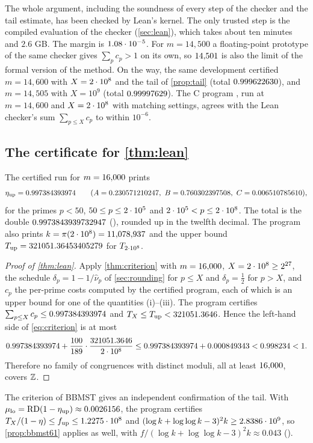 The whole argument, including the soundness of every step of the checker and the tail estimate, has been checked by
Lean's kernel. The only trusted step is the compiled evaluation of the checker (\cref{sec:lean}), which takes about ten
minutes and $2.6$ GB. The margin is $1.08\cdot10^{-5}$. For $m=14{,}500$ a floating-point prototype of the same checker
gives $\sum_pc_p>1$ on its own, so $14{,}501$ is also the limit of the formal version of the method. On the way, the
same development certified $m=14{,}600$ with $X=2\cdot 10^{8}$ and the tail of \cref{prop:tail} (total $0.999622630$), and
$m=14{,}505$ with $X=10^9$ (total $0.99997629$). The C program , run at
$m=14{,}600$ and $X=2\cdot 10^{8}$ with matching settings, agrees with the Lean checker's sum $\sum_{p\le X}c_p$ to within
$10^{-6}$.

\subsection{The certificate for \cref{thm:lean}}\label{sec:certified-lean}

The certified run for $m=16{,}000$ prints
\[
  \eta_{\mathrm{up}}=\etaCertTwelve\qquad(A=\blockA,\ B=\blockB,\ C=\blockC),
\]
for the primes $p<50$, $50\le p\le2\cdot 10^{5}$ and $2\cdot 10^{5}<p\le2\cdot 10^{8}$. The total is the double $0.9973843939732947$
(\code{\etaCertHex}), rounded up in the twelfth decimal. The program also prints $k=\pi(2\cdot 10^{8})=11{,}078{,}937$ and the upper
bound $T_{\mathrm{up}}=321051.36453405279$ for $T_{2\cdot 10^{8}}$.

\begin{proof}[Proof of \cref{thm:lean}]
Apply \cref{thm:criterion} with $m=16{,}000$, $X=2\cdot 10^{8}\ge2^{27}$, the schedule $\delta_p=1-1/\hat\nu_p$ of
\cref{sec:rounding} for $p\le X$ and $\delta_p=\frac12$ for $p>X$, and $c_p$ the per-prime costs computed by the
certified program, each of which is an upper bound for one of the quantities (i)--(iii). The program certifies
$\sum_{p\le X}c_p\le0.997384393974$ and $T_X\le T_{\mathrm{up}}<321051.3646$. Hence the left-hand side of
\eqref{eq:criterion} is at most
\[
  0.997384393974+\frac{100}{189}\cdot\frac{321051.3646}{2\cdot 10^{8}}
  \le0.997384393974+0.000849343<0.998234<1 .
\]
Therefore no family of congruences with distinct moduli, all at least $16{,}000$, covers $\mathbb{Z}$.
\end{proof}

The criterion of BBMST gives an independent confirmation of the tail. With
$\mu_{\mathrm{lo}}=\mathrm{RD}(1-\eta_{\mathrm{up}})\approx0.0026156$, the program certifies
$T_X/(1-\eta)\le f_{\mathrm{up}}\le1.2275\cdot 10^{8}$ and $(\log k+\log\log k-3)^2k\ge2.8386\cdot 10^{9}$, so \cref{prop:bbmst61} applies as
well, with $f/(\log k+\log\log k-3)^2k\approx0.043$ ().

